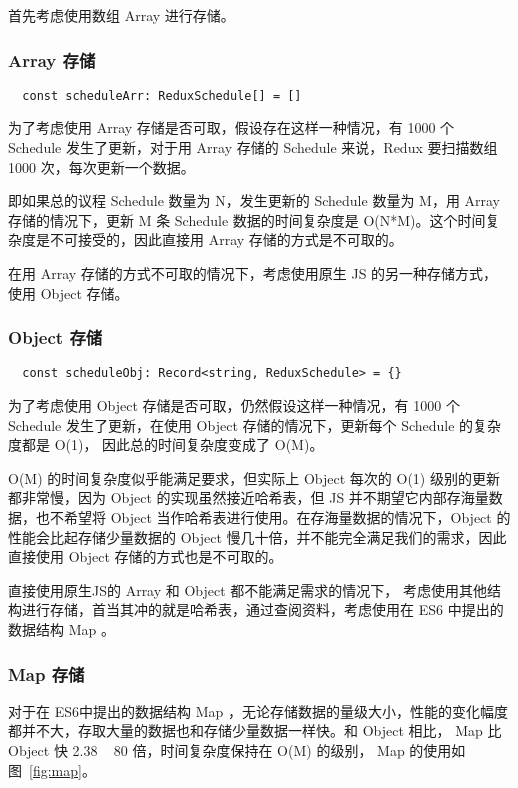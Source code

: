 首先考虑使用数组 Array 进行存储。

\subsubsection{Array 存储}

{\setmainfont{Courier New Bold}
\begin{lstlisting}
  const scheduleArr: ReduxSchedule[] = []
 \end{lstlisting}}
为了考虑使用 Array 存储是否可取，假设存在这样一种情况，有 1000 个 Schedule 发生了更新，对于用 Array 存储的 Schedule 来说，Redux 要扫描数组 1000 次，每次更新一个数据。

即如果总的议程 Schedule 数量为 N，发生更新的 Schedule 数量为 M，用 Array 存储的情况下，更新 M 条 Schedule 数据的时间复杂度是 O(N*M)。这个时间复杂度是不可接受的，因此直接用 Array 存储的方式是不可取的。

在用 Array 存储的方式不可取的情况下，考虑使用原生 JS 的另一种存储方式， 使用 Object 存储。

\subsubsection{Object 存储}

{\setmainfont{Courier New Bold}
\begin{lstlisting}
  const scheduleObj: Record<string, ReduxSchedule> = {}
 \end{lstlisting}}
为了考虑使用 Object 存储是否可取，仍然假设这样一种情况，有 1000 个 Schedule 发生了更新，在使用 Object 存储的情况下，更新每个 Schedule 的复杂度都是 O(1)， 因此总的时间复杂度变成了 O(M)。

O(M) 的时间复杂度似乎能满足要求，但实际上 Object 每次的 O(1) 级别的更新都非常慢，因为 Object 的实现虽然接近哈希表，但 JS 并不期望它内部存海量数据，也不希望将 Object 当作哈希表进行使用。在存海量数据的情况下，Object 的性能会比起存储少量数据的 Object 慢几十倍，并不能完全满足我们的需求，因此直接使用 Object 存储的方式也是不可取的。


直接使用原生JS的 Array 和 Object 都不能满足需求的情况下， 考虑使用其他结构进行存储，首当其冲的就是哈希表，通过查阅资料，考虑使用在 ES6 中提出的数据结构 Map 。

\subsubsection{Map 存储}

对于在 ES6中提出的数据结构 Map ，无论存储数据的量级大小，性能的变化幅度都并不大，存取大量的数据也和存储少量数据一样快。和 Object 相比， Map 比 Object 快 2.38 ~ 80 倍，时间复杂度保持在 O(M) 的级别， Map 的使用如图~\ref{fig:map}。


